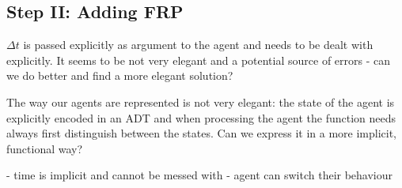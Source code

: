 \subsection{Step II: Adding FRP}
\item $\Delta t$ is passed explicitly as argument to the agent and needs to be dealt with explicitly. It seems to be not very elegant and a potential source of errors - can we do better and find a more elegant solution? 
	\item The way our agents are represented is not very elegant: the state of the agent is explicitly encoded in an ADT and when processing the agent the function needs always first distinguish between the states. Can we express it in a more implicit, functional way?
	
- time is implicit and cannot be messed with
- agent can switch their behaviour